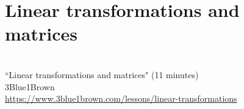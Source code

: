 \section{Linear transformations and matrices}
\begin{bookfigure}
   \\
  ``Linear transformations and matrices" (11 minutes) \\
  \footnotesize 3Blue1Brown \\
  \url{https://www.3blue1brown.com/lessons/linear-transformations}
\end{bookfigure}
